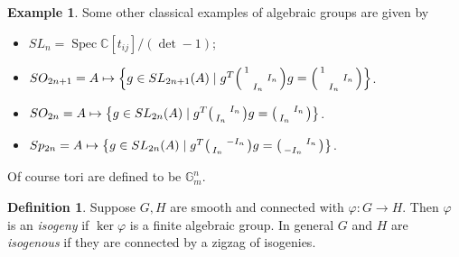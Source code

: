 \documentclass[leqno, openany]{memoir}
\theoremstyle{definition}
\newtheorem{defn}[thm]{Definition}
\newtheorem{exm}[thm]{Example}
\theoremstyle{remark}
\theoremstyle{plain}
\theoremstyle{definition}
\theoremstyle{remark}
\newcommand{\C}{\mathbb{C}}
\DeclareMathOperator{\Spec}{Spec}
\begin{document}
\begin{exm}
    Some other classical examples of algebraic groups are given by
    \begin{itemize}
        \item $SL_n = \Spec \C[t_{ij}]/(\det - 1)$;
        \item $SO_{2n+1} = A \mapsto \qty{g \in SL_{2n+1}(A) \mid g^T \begin{psmallmatrix}
                1 & \\
                & & I_n \\
                & I_n
        \end{psmallmatrix} g = \begin{psmallmatrix}
            1 & \\ 
            & & I_n \\
            & I_n
        \end{psmallmatrix}
        }$.
        \item $SO_{2n} = A \mapsto \qty{g \in SL_{2n}(A) \mid g^T \begin{psmallmatrix}
                    & I_n \\ I_n
            \end{psmallmatrix} g = \begin{psmallmatrix}
                & I_n \\ I_n
            \end{psmallmatrix}
            }$.
        \item $Sp_{2n} = A \mapsto \qty{g \in SL_{2n}(A) \mid g^T \begin{psmallmatrix}
                    & -I_n \\ I_n
            \end{psmallmatrix} g = \begin{psmallmatrix}
                & I_n \\ -I_n
            \end{psmallmatrix}
            }$.
    \end{itemize}
    Of course tori are defined to be $\mathbb{G}_m^n$.
\end{exm}

\begin{defn}
    Suppose $G, H$ are smooth and connected with $\varphi \colon G \to H$. Then $\varphi$ is an \textit{isogeny} if $\ker \varphi$ is a finite algebraic group. In general $G$ and $H$ are \textit{isogenous} if they are connected by a zigzag of isogenies.
\end{defn}
\end{document}
